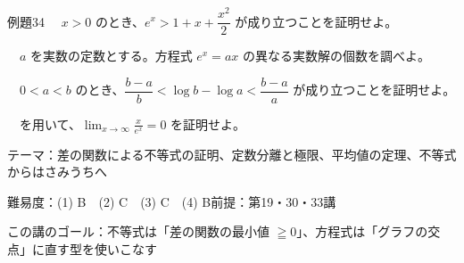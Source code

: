 \documentclass[paper=b5j, fontsize=8pt, fleqn, twoside]{jlreq}
\begin{document}
\begin{ascolorbox4A}[出典：オリジナル]{例題34}
  　$x>0$ のとき、$e^x>1+x+\dfrac{x^2}2$ が成り立つことを証明せよ。\par
  　$a$ を実数の定数とする。方程式 $e^x=ax$ の異なる実数解の個数を調べよ。\par
  　$0<a<b$ のとき、$\dfrac{b-a}b<\log b-\log a<\dfrac{b-a}a$ が成り立つことを証明せよ。\par
  　を用いて、$\displaystyle\lim_{x\to\infty}\frac x{e^x}=0$ を証明せよ。
\end{ascolorbox4A}

\begin{Data}
  テーマ：差の関数による不等式の証明、定数分離と極限、平均値の定理、不等式からはさみうちへ\par
  難易度：(1) B　(2) C　(3) C　(4) B\quad 前提：第19・30・33講\par
  この講のゴール：不等式は「差の関数の最小値 $\geqq0$」、方程式は「グラフの交点」に直す型を使いこなす
\end{Data}
\end{document}
